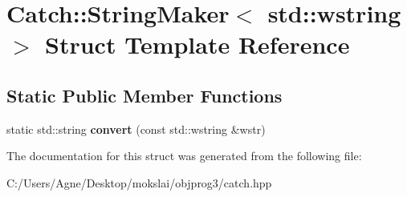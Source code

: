 \hypertarget{struct_catch_1_1_string_maker_3_01std_1_1wstring_01_4}{}\section{Catch\+:\+:String\+Maker$<$ std\+:\+:wstring $>$ Struct Template Reference}
\label{struct_catch_1_1_string_maker_3_01std_1_1wstring_01_4}
\subsection*{Static Public Member Functions}
\begin{DoxyCompactItemize}
\item 
\mbox{\label{struct_catch_1_1_string_maker_3_01std_1_1wstring_01_4_a375d49d6281bee4d36d853fa1bd5ebbd}} 
static std\+::string {\bfseries convert} (const std\+::wstring \&wstr)
\end{DoxyCompactItemize}


The documentation for this struct was generated from the following file\+:\begin{DoxyCompactItemize}
\item 
C\+:/\+Users/\+Agne/\+Desktop/mokslai/objprog3/catch.\+hpp\end{DoxyCompactItemize}
